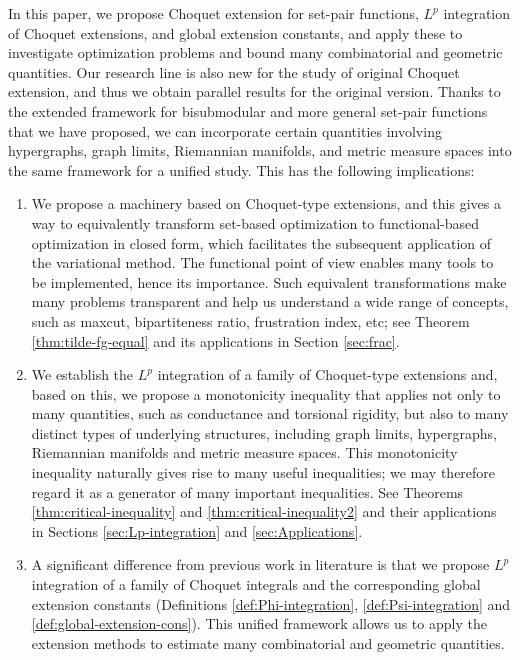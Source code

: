 \documentclass[12pt,a4paper]{article}
\begin{document}
In this paper, we propose Choquet extension for  set-pair functions, $L^p$ integration of Choquet extensions, and global extension constants, and apply these to investigate optimization problems and bound many combinatorial and geometric quantities. 
Our research line is also new for the study of original Choquet extension, and thus we obtain parallel results for the original version. 
Thanks to the extended framework for bisubmodular and more general set-pair functions that we have proposed, we can incorporate certain quantities involving hypergraphs, graph limits,  Riemannian manifolds, and metric measure spaces into the same framework for a unified study. This has the following implications: 
\begin{enumerate}
\item We propose a machinery  based on Choquet-type extensions, and this gives a way to equivalently transform set-based optimization to functional-based optimization in closed form, which facilitates the subsequent application of the variational method. 
The functional point of view enables many tools to be implemented, hence its importance. Such equivalent transformations make many problems transparent and help us understand a wide range of concepts, such as maxcut, bipartiteness ratio, frustration index, etc; see Theorem \ref{thm:tilde-fg-equal} and its applications in Section \ref{sec:frac}.
\item %
We establish the $L^p$ integration of a family of Choquet-type extensions and, based on this, we propose a monotonicity inequality that applies not only to many quantities, such as conductance and torsional rigidity, but also to many distinct types of underlying structures, including graph limits, hypergraphs, Riemannian manifolds and metric measure spaces.  
This monotonicity inequality naturally gives rise to many useful inequalities; we may therefore regard it as a generator of many important inequalities. See Theorems \ref{thm:critical-inequality} and \ref{thm:critical-inequality2} and their applications in Sections \ref{sec:Lp-integration} and \ref{sec:Applications}. 
\item A significant difference from previous work in literature \cite{Choquet,Lovasz83,Lovasz25,Jost/Zhang24a} is that we propose $L^p$ integration of a family of Choquet integrals and the corresponding global extension constants (Definitions \ref{def:Phi-integration}, \ref{def:Psi-integration} and \ref{def:global-extension-cons}). This unified framework allows us to apply the extension methods to estimate many combinatorial and geometric quantities.
\end{enumerate}
\end{document}
